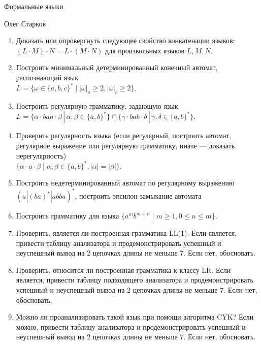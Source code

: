 \documentclass[12pt]{article}
\begin{document}
\begin{center}
{\LARGE Формальные языки}

\bigskip

{\Large Олег Старков}
\end{center} 

\bigskip

\begin{enumerate}
  \item Доказать или опровергнуть следующее свойство конкатенации языков: $( L \cdot M ) \cdot N = L \cdot (M \cdot N) $ для произвольных языков $L, M, N$.
  \item Построить минимальный детерминированный конечный автомат, распознающий язык \\ $L = \{\omega \in \{ a, b, c \}^* \mid | \omega |_a \geq 2, | \omega |_b \geq 2 \}$.

  \item Построить регулярную грамматику, задающую язык \\ $ L = \{ \alpha \cdot baa \cdot \beta \, | \, \alpha, \beta \in \{ a, b \}^* \} \cap \{ \gamma \cdot bab \cdot \delta \, | \, \gamma, \delta \in \{ a, b \}^* \} $.
  \item Проверить регулярность языка (если регулярный, построить автомат, регулярное выражение или регулярную грамматику, иначе --- доказать нерегулярность) \\ $\{ \alpha \cdot a \cdot \beta \mid \alpha, \beta \in \{ a, b\}^*, |\alpha| = |\beta| \} $.
  \item {Построить недетерминированный автомат по регулярному выражению $ (a | (ba)^* | abba )^*  $, построить эпсилон-замыкание автомата }
  
  \item Построить грамматику для языка $\{ a^m b^{m+n} \mid m \geq 1, 0 \leq n \leq m \}$.
  
  \item Проверить, является ли построенная грамматика LL(1). Если является, привести таблицу анализатора и продемонстрировать успешный и неуспешный вывод на 2 цепочках длины не меньше 7. Если нет, обосновать. 
  \item Проверить, относится ли построенная грамматика к классу LR. Если является, привести таблицу подходящего анализатора и продемонстрировать успешный и неуспешный вывод на 2 цепочках длины не меньше 7. Если нет, обосновать.
  \item Можно ли проанализировать такой язык при помощи алгоритма CYK? Если можно, привести таблицу анализатора и продемонстрировать успешный и неуспешный вывод на 2 цепочках длины не меньше 7. Если нет, обосновать.
  

\end{enumerate}
\end{document}
